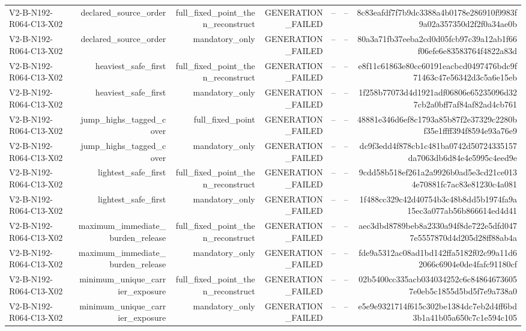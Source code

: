 {\begin{longtable}{lrrrrrr}
V2-B-N192-R064-C13-X02 & declared\_source\_order & full\_fixed\_point\_then\_reconstruct & GENERATION\_FAILED & -- & -- & 8c83eafdf7f7b9dc3388a4b0178e286910f9983f9a02a357350d2f2f0a34ae0b \\
V2-B-N192-R064-C13-X02 & declared\_source\_order & mandatory\_only & GENERATION\_FAILED & -- & -- & 80a3a71fb37eeba2cd0d05fcb97c39a12ab1f66f06efe6e83583764f4822a83d \\
V2-B-N192-R064-C13-X02 & heaviest\_safe\_first & full\_fixed\_point\_then\_reconstruct & GENERATION\_FAILED & -- & -- & e8f11c61863e80cc60191eacbcd0497476bdc9f71463c47e56342d3c5a6e15eb \\
V2-B-N192-R064-C13-X02 & heaviest\_safe\_first & mandatory\_only & GENERATION\_FAILED & -- & -- & 1f258b77073d4d1921adf06806e65235096d327cb2a0bff7af84af82ad4cb761 \\
V2-B-N192-R064-C13-X02 & jump\_highs\_tagged\_cover & full\_fixed\_point & GENERATION\_FAILED & -- & -- & 48881e346d6ef8c1793a85b87f2e37329c2280bf35e1ffff394f8594e93a76e9 \\
V2-B-N192-R064-C13-X02 & jump\_highs\_tagged\_cover & mandatory\_only & GENERATION\_FAILED & -- & -- & dc9f3edd4f878cb1c481ba0742d50724335157da7063db6d84e4e5995c4eed9e \\
V2-B-N192-R064-C13-X02 & lightest\_safe\_first & full\_fixed\_point\_then\_reconstruct & GENERATION\_FAILED & -- & -- & 9cdd58b518ef261a2a9926b0ad5e3cd21ce0134e70881fc7ac83e81230c4a081 \\
V2-B-N192-R064-C13-X02 & lightest\_safe\_first & mandatory\_only & GENERATION\_FAILED & -- & -- & 1f488cc329c42d40754b3c48b8dd5b1974fa9a15ec3a077ab56b866614ed4d41 \\
V2-B-N192-R064-C13-X02 & maximum\_immediate\_burden\_release & full\_fixed\_point\_then\_reconstruct & GENERATION\_FAILED & -- & -- & aec3dbd8789beb8a2330a94f8de722e5dfd0477e5557870d4d205d28ff88ab4a \\
V2-B-N192-R064-C13-X02 & maximum\_immediate\_burden\_release & mandatory\_only & GENERATION\_FAILED & -- & -- & fde9a5312ac08ad1bd142ffa5182f02c99a11d62066c6904e0de4fafc91180cf \\
V2-B-N192-R064-C13-X02 & minimum\_unique\_carrier\_exposure & full\_fixed\_point\_then\_reconstruct & GENERATION\_FAILED & -- & -- & 02b5400cc335acb034034252c6c848646736057e0eb5c1855d5bd5f7e9a738a0 \\
V2-B-N192-R064-C13-X02 & minimum\_unique\_carrier\_exposure & mandatory\_only & GENERATION\_FAILED & -- & -- & e5e9e9321714f615c302be1384dc7eb2d4ff6bd3b1a41b05a650c7c1e594c105 \\

\end{longtable}}
